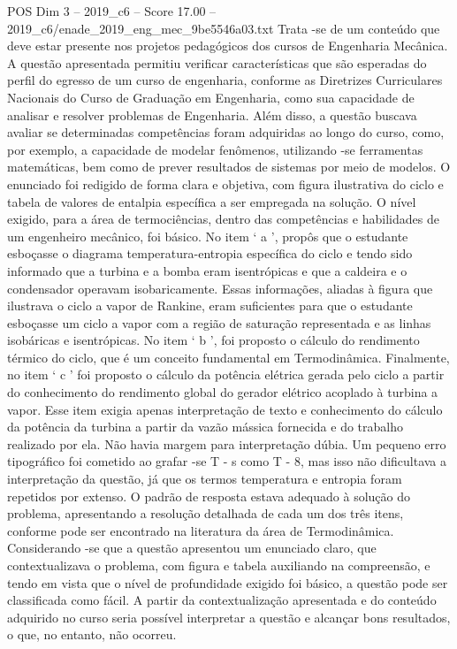 \begin{textsample}{POS Dim 3 – 2019\_c6 – Score 17.00 – 2019\_c6/enade\_2019\_eng\_mec\_9be5546a03.txt}
Trata -se de um conteúdo que deve estar presente nos projetos pedagógicos dos cursos de Engenharia Mecânica.
A questão apresentada permitiu verificar características que são esperadas do perfil do egresso de um curso de engenharia, conforme as Diretrizes Curriculares Nacionais do Curso de Graduação em Engenharia, como sua capacidade de analisar e resolver problemas de Engenharia.
Além disso, a questão buscava avaliar se determinadas competências foram adquiridas ao longo do curso, como, por exemplo, a capacidade de modelar fenômenos, utilizando -se ferramentas matemáticas, bem como de prever resultados de sistemas por meio de modelos.
O enunciado foi redigido de forma clara e objetiva, com figura ilustrativa do ciclo e tabela de valores de entalpia específica a ser empregada na solução.
O nível exigido, para a área de termociências, dentro das competências e habilidades de um engenheiro mecânico, foi básico.
No item ‘ a ’, propôs que o estudante esboçasse o diagrama temperatura-entropia específica do ciclo e tendo sido informado que a turbina e a bomba eram isentrópicas e que a caldeira e o condensador operavam isobaricamente.
Essas informações, aliadas à figura que ilustrava o ciclo a vapor de Rankine, eram suficientes para que o estudante esboçasse um ciclo a vapor com a região de saturação representada e as linhas isobáricas e isentrópicas.
No item ‘ b ’, foi proposto o cálculo do rendimento térmico do ciclo, que é um conceito fundamental em Termodinâmica.
Finalmente, no item ‘ c ’ foi proposto o cálculo da potência elétrica gerada pelo ciclo a partir do conhecimento do rendimento global do gerador elétrico acoplado à turbina a vapor.
Esse item exigia apenas interpretação de texto e conhecimento do cálculo da potência da turbina a partir da vazão mássica fornecida e do trabalho realizado por ela.
Não havia margem para interpretação dúbia.
Um pequeno erro tipográfico foi cometido ao grafar -se T - s como T - 8, mas isso não dificultava a interpretação da questão, já que os termos temperatura e entropia foram repetidos por extenso.
O padrão de resposta estava adequado à solução do problema, apresentando a resolução detalhada de cada um dos três itens, conforme pode ser encontrado na literatura da área de Termodinâmica.
Considerando -se que a questão apresentou um enunciado claro, que contextualizava o problema, com figura e tabela auxiliando na compreensão, e tendo em vista que o nível de profundidade exigido foi básico, a questão pode ser classificada como fácil.
A partir da contextualização apresentada e do conteúdo adquirido no curso seria possível interpretar a questão e alcançar bons resultados, o que, no entanto, não ocorreu.

\end{textsample}

